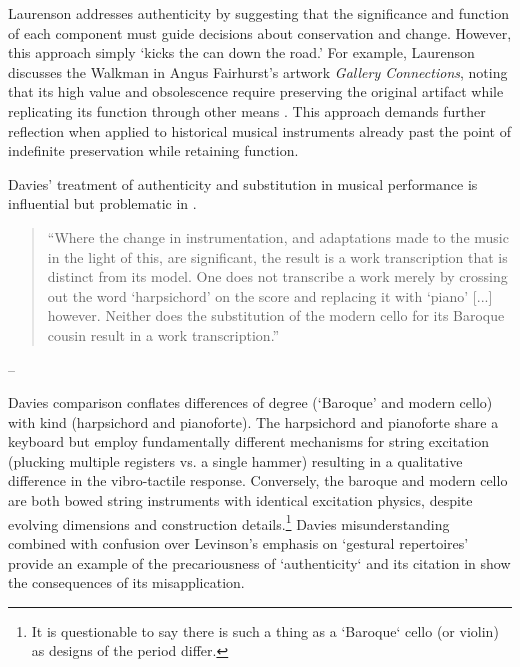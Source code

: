 Laurenson \citeyear{laurenson_authenticity_2006} addresses authenticity by suggesting that the significance and function of each component must guide decisions about conservation and change. However, this approach simply  `kicks the can down the road.’ For example, Laurenson discusses the Walkman in Angus Fairhurst’s artwork \textit{Gallery Connections}, noting that its high value and obsolescence require preserving the original artifact while replicating its function through other means \cite{laurenson_management_2005}. This approach demands further reflection when applied to historical musical instruments already past the point of indefinite preservation while retaining function.

Davies' \citeyear{davies_authenticity_2001} treatment of authenticity and substitution in musical performance is influential but problematic in \cite{laurenson_authenticity_2006}. 

\begin{quotation}
    ``Where the change in instrumentation, and adaptations made to the music in the light of this, are significant, the result is a work transcription that is distinct from its model. One does not transcribe a work merely by crossing out the word ‘harpsichord’ on the score and replacing it with ‘piano’ [...] however. Neither does the substitution of the modern cello for its Baroque cousin result in a work transcription.''
\end{quotation}
\begin{flushright}
-- \cite[p. 222]{davies_authenticity_2001}
\end{flushright}

Davies comparison conflates differences of degree (`Baroque' and modern cello) with kind (harpsichord and pianoforte). The harpsichord and pianoforte share a keyboard but employ fundamentally different mechanisms for string excitation (plucking multiple registers vs. a single hammer) resulting in a qualitative difference in the vibro-tactile response. Conversely, the baroque and modern cello are both bowed string instruments with identical excitation physics, despite evolving dimensions and construction details.\footnote{It is questionable to say there is such a thing as a `Baroque` cello (or violin) as designs of the period differ.} Davies misunderstanding combined with confusion over Levinson's emphasis on `gestural repertoires' \cite{levinson_music_1990} provide an example of the precariousness of `authenticity` and its citation in \cite{laurenson_authenticity_2006} show the consequences of its misapplication.

